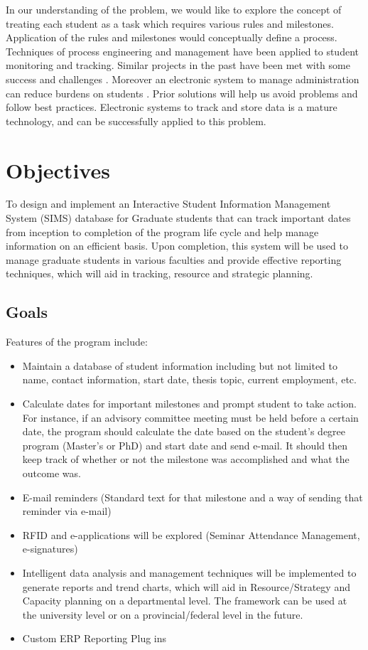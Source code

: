 \documentclass{journal}
\begin{document}
In our understanding of the problem, we would like to explore the concept of treating each student as a task which requires various rules and milestones. Application of the rules and milestones would conceptually define a process. Techniques of process engineering and management 
have been applied to student monitoring and tracking. Similar projects in the past have been met with some success and challenges \cite{flex}. 
Moreover an electronic system to manage administration can reduce burdens on students \cite{adv}. Prior solutions will help us avoid problems and follow best practices. 
Electronic systems to track and store data is a mature technology, and can be successfully applied to this problem. 

\section{Objectives}

To design and implement an Interactive Student Information Management System (SIMS) database for Graduate students that can track important dates from inception 
to completion of the program life cycle and help manage information on an efficient basis. Upon completion, this system will be used to manage graduate students 
in various faculties and provide effective reporting techniques, which will aid in tracking, resource and strategic planning.
\subsection{ Goals }
 Features of the program include:
\begin{itemize}
  \item{Maintain a database of student information including but not limited to name, contact information, start date, thesis topic, current employment, etc.}
  \item{Calculate dates for important milestones and prompt student to take action. For instance, if an advisory committee meeting must be held before a certain date, the program should calculate the date based on the student's degree program (Master's or PhD) and start date and send e-mail. It should then keep track of whether or not the milestone was accomplished and what the outcome was.}
  \item{ E-mail reminders (Standard text for that milestone and a way of sending that reminder via e-mail) }
  \item{ RFID and e-applications will be explored (Seminar Attendance Management, e-signatures) }
  \item{ Intelligent data analysis and management techniques will be implemented to generate reports and trend charts, which will aid in Resource/Strategy and Capacity planning on a departmental level. The framework can be used at the university level or on a provincial/federal level in the future. } 
  \item{ Custom ERP Reporting Plug ins }
\end{itemize}
\end{document}
